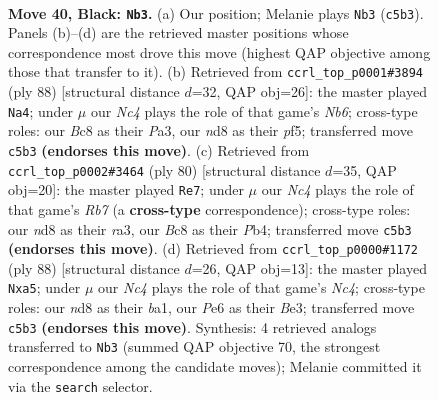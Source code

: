 \documentclass[11pt]{article}
\begin{document}
\clearpage

\begin{figure}[p]\centering
\begin{subfigure}{0.46\textwidth}\centering
\resizebox{\linewidth}{!}{%
\newchessgame
\chessboard[
  setfen={r1bN4/6k1/2PBp3/Ppnp4/8/2P2K2/8/R7 b - - 3 40},
  showmover=false,
  pgfstyle=straightmove, color=movearrow, markmove={c5-b3}
]}
\caption{}
\end{subfigure}\hfill
\begin{subfigure}{0.46\textwidth}\centering
\resizebox{\linewidth}{!}{%
\newchessgame
\chessboard[
  setfen={3r4/2n1k1p1/1N1p4/pP3p2/2P5/P2R4/5K2/8 w - - 0 45},
  showmover=false,
  pgfstyle=straightmove, color=movearrow, markmove={b6-a4}
]}
\caption{}
\end{subfigure}
\\[4pt]
\begin{subfigure}{0.46\textwidth}\centering
\resizebox{\linewidth}{!}{%
\newchessgame
\chessboard[
  setfen={3n4/1R4pk/p2B1p2/8/1P4PP/r7/5K2/8 w - - 4 41},
  showmover=false,
  pgfstyle=straightmove, color=movearrow, markmove={b7-e7}
]}
\caption{}
\end{subfigure}\hfill
\begin{subfigure}{0.46\textwidth}\centering
\resizebox{\linewidth}{!}{%
\newchessgame
\chessboard[
  setfen={6k1/3R3p/2r3p1/p7/n1N3P1/4B2P/5P2/b4K2 w - - 2 45},
  showmover=false,
  pgfstyle=straightmove, color=movearrow, markmove={c4-a5}
]}
\caption{}
\end{subfigure}
\caption{\textbf{Move 40, Black: \texttt{Nb3}.} (a) Our position; Melanie plays \texttt{Nb3} (\texttt{c5b3}). Panels (b)--(d) are the retrieved master positions whose correspondence most drove this move (highest QAP objective among those that transfer to it). (b) Retrieved from \texttt{ccrl\_top\_p0001\#3894} (ply 88) [structural distance $d$=32, QAP obj=26]: the master played \texttt{Na4}; under $\mu$ our \emph{Nc4} plays the role of that game's \emph{Nb6}; cross-type roles: our \emph{B}c8 as their \emph{P}a3, our \emph{n}d8 as their \emph{p}f5; transferred move \texttt{c5b3} \textbf{(endorses this move)}. (c) Retrieved from \texttt{ccrl\_top\_p0002\#3464} (ply 80) [structural distance $d$=35, QAP obj=20]: the master played \texttt{Re7}; under $\mu$ our \emph{Nc4} plays the role of that game's \emph{Rb7} (a \textbf{cross-type} correspondence); cross-type roles: our \emph{n}d8 as their \emph{r}a3, our \emph{B}c8 as their \emph{P}b4; transferred move \texttt{c5b3} \textbf{(endorses this move)}. (d) Retrieved from \texttt{ccrl\_top\_p0000\#1172} (ply 88) [structural distance $d$=26, QAP obj=13]: the master played \texttt{Nxa5}; under $\mu$ our \emph{Nc4} plays the role of that game's \emph{Nc4}; cross-type roles: our \emph{n}d8 as their \emph{b}a1, our \emph{P}e6 as their \emph{B}e3; transferred move \texttt{c5b3} \textbf{(endorses this move)}. Synthesis: 4 retrieved analogs transferred to \texttt{Nb3} (summed QAP objective 70, the strongest correspondence among the candidate moves); Melanie committed it via the \texttt{search} selector.}
\label{fig:thought-m79}
\end{figure}
\end{document}
